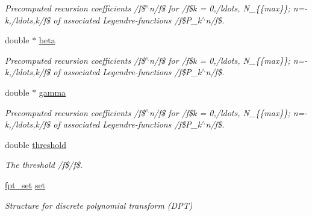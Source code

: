 \begin{DoxyCompactItemize}
\begin{DoxyCompactList}\small\item\em Precomputed recursion coefficients /f\$$^\wedge$n/f\$ for /f\$k = 0,/ldots, N\-\_\-\{\{max\}\}; n=-\/k,/ldots,k/f\$ of associated Legendre-\/functions /f\$\-P\-\_\-k$^\wedge$n/f\$. \end{DoxyCompactList}\item 
\hypertarget{structnfsft__wisdom_a6bcfe5201d3fed513c2cdb37832ee255}{double $\ast$ \hyperlink{structnfsft__wisdom_a6bcfe5201d3fed513c2cdb37832ee255}{beta}}\label{structnfsft__wisdom_a6bcfe5201d3fed513c2cdb37832ee255}

\begin{DoxyCompactList}\small\item\em Precomputed recursion coefficients /f\$$^\wedge$n/f\$ for /f\$k = 0,/ldots, N\-\_\-\{\{max\}\}; n=-\/k,/ldots,k/f\$ of associated Legendre-\/functions /f\$\-P\-\_\-k$^\wedge$n/f\$. \end{DoxyCompactList}\item 
\hypertarget{structnfsft__wisdom_a1703c0339b14ee1f0956d3e394f598e2}{double $\ast$ \hyperlink{structnfsft__wisdom_a1703c0339b14ee1f0956d3e394f598e2}{gamma}}\label{structnfsft__wisdom_a1703c0339b14ee1f0956d3e394f598e2}

\begin{DoxyCompactList}\small\item\em Precomputed recursion coefficients /f\$$^\wedge$n/f\$ for /f\$k = 0,/ldots, N\-\_\-\{\{max\}\}; n=-\/k,/ldots,k/f\$ of associated Legendre-\/functions /f\$\-P\-\_\-k$^\wedge$n/f\$. \end{DoxyCompactList}\item 
\hypertarget{structnfsft__wisdom_ac367edaa1fae041e5b049cd81b44336b}{double \hyperlink{structnfsft__wisdom_ac367edaa1fae041e5b049cd81b44336b}{threshold}}\label{structnfsft__wisdom_ac367edaa1fae041e5b049cd81b44336b}

\begin{DoxyCompactList}\small\item\em The threshold /f\$/f\$. \end{DoxyCompactList}\item 
\hypertarget{structnfsft__wisdom_a18de3dcf9ca2e2e577fccfcca712bfd2}{\hyperlink{nfft3_8h_a73d630ac21d6474ba0693f124d465e15}{fpt\-\_\-set} \hyperlink{structnfsft__wisdom_a18de3dcf9ca2e2e577fccfcca712bfd2}{set}}\label{structnfsft__wisdom_a18de3dcf9ca2e2e577fccfcca712bfd2}

\begin{DoxyCompactList}\small\item\em Structure for {\itshape discrete} {\itshape polynomial} {\itshape transform} ({\itshape D\-P\-T}) \end{DoxyCompactList}\end{DoxyCompactItemize}


